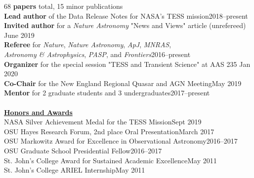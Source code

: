 \documentclass[letterpaper,11pt]{article}
\newcommand{\award}[2]{#1\hfill#2}
\begin{document}
 68 \textbf{papers} total,  15 minor publications\\ %
 \textbf{Lead author} of the Data Release Notes for NASA's TESS mission\hfill 2018--present\\
\textbf{Invited author} for a \textit{Nature Astronomy} "News and Views" article (unrefereed) \hfill June 2019\\
\textbf{Referee} for \textit{Nature}, \textit{Nature Astronomy}, \textit{ApJ}, \textit{MNRAS}, \\ \indent \textit{Astronomy \& Astrophysics}, \textit{PASP}, and
  \textit{Frontiers}\hfill 2016--present\\%
 \textbf{Organizer} for the special session "TESS and Transient Science" at  AAS 235 \hfill Jan 2020\\
  \textbf{Co-Chair} for the New England Regional Quasar and AGN Meeting\hfill May 2019\\
   \textbf{Mentor} for 2 graduate students and 3 undergraduates\hfill 2017--present\\
\\
\noindent\underline{\textbf{Honors and Awards}}\\
\award{NASA Silver Achievement Medal for the TESS Mission}{Sept 2019}\\
\award{OSU Hayes Research Forum, 2nd place Oral Presentation}{March 2017} \\
\award{OSU Markowitz Award for Excellence in Observational Astronomy}{2016--2017}\\
\award{OSU Graduate School Presidential Fellow}{2016--2017}\\
\award{St. John's College Award for Sustained Academic Excellence}{May 2011}\\
\award{St. John's College ARIEL Internship}{May 2011}\\
\\
\end{document}
